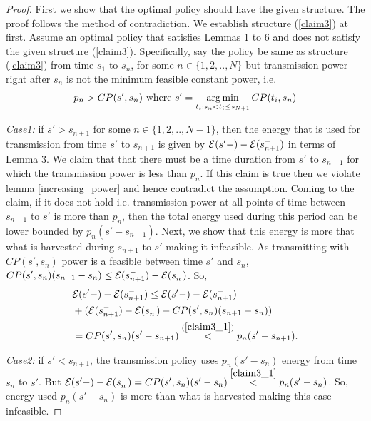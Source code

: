 \begin{proof}
First we show that the optimal policy should have the given structure. The proof follows the method of  contradiction. We establish structure (\ref{claim3}) at first. Assume an optimal policy that satisfies Lemmas 1 to 6 and does not satisfy the given structure (\ref{claim3}). Specifically, say the policy be same as structure (\ref{claim3}) from time $s_{1}$ to $s_n$, for some $n\in \{1,2,..,N\}$ but transmission power right after $s_n$ is not the minimum feasible constant power, i.e.
\begin{align}
p_n>CP(s',s_n)\text{ where } s'=\argmin_{t_i: s_n < t_i \le s_{N+1}} CP(t_i,s_n)\label{claim3_1}
\end{align}

\textit{Case1: }if $s'>s_{n+1}$ for some $n\in \{1,2,..,N-1\}$, then the energy that is used for transmission from time $s'$ to $s_{n+1}$ is given by $\mathcal{E}(s'-)-\mathcal{E}(s_{n+1}^-)$ in terms of Lemma 3. We claim that that there must be a time duration from $s'$ to $s_{n+1}$ for which the transmission power is less than $p_n$. If this claim is true then we violate lemma \ref{increasing_power} and hence contradict the assumption. Coming to the claim, if it does not hold i.e. transmission power at all points of time between $s_{n+1}$ to $s'$ is more than $p_n$, then the total energy used during this period can be lower bounded by $p_n(s'-s_{n+1})$. Next, we show that this energy is more that what is harvested during $s_{n+1}$ to $s'$ making it infeasible. As transmitting with $CP(s',s_n)$ power is a feasible between time $s'$ and $s_n$, $CP(s',s_n)(s_{n+1}-s_n)\le \mathcal{E}(s_{n+1}^-)-\mathcal{E}(s_{n}^-)$. So, 
\begin{align}
&\mathcal{E}(s'-)-\mathcal{E}(s_{n+1}^-) \le \mathcal{E}(s'-)-\mathcal{E}(s_{n+1}^-)
\\
&+(\mathcal{E}(s_{n+1}^-)-\mathcal{E}(s_{n}^-)-CP(s',s_n)(s_{n+1}-s_n))
\\
&=CP(s',s_n)(s'-s_{n+1})\stackrel{(\ref{claim3_1})}{<}p_n (s'-s_{n+1}).
\end{align}

\textit{Case2: }if $s'<s_{n+1}$, the transmission policy uses $p_n(s'-s_{n})$ energy from time $s_n$ to $s'$. But $\mathcal{E}(s'-)-\mathcal{E}(s_{n}^-)=CP(s',s_n)(s'-s_{n})\stackrel{\ref{claim3_1}}{<}p_n(s'-s_{n})$. So, energy used $p_n(s'-s_{n})$ is more than what is harvested making this case infeasible.


\end{proof}
